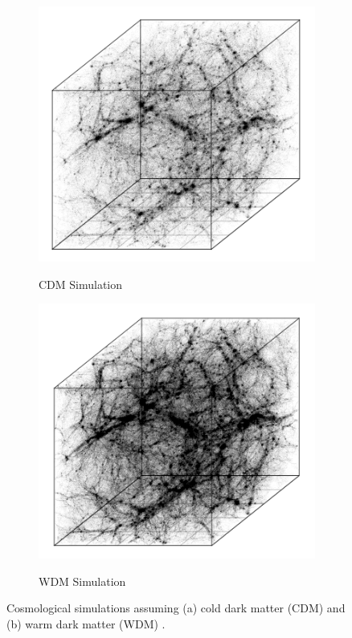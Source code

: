 \documentclass[12pt]{article}
\begin{document}
\begin{figure}[htp!]
  \centering
  \begin{subfigure}{.40\textwidth}
    \centering
    \caption{CDM Simulation}  \includegraphics[width=\linewidth]{figure_1_whole_wdm.png}
    \label{fig:introDataCDM}
  \end{subfigure}
    \begin{subfigure}{.40\textwidth}
    \centering
    \caption{WDM Simulation}  \includegraphics[width=\linewidth]{figure_1_whole_cdm.png}
    \label{fig:introDataWDM}
  \end{subfigure}
    \caption{Cosmological simulations assuming (a) cold dark matter (CDM) and (b) warm dark matter (WDM) \citep{schaye2015eagle}. }
    \label{fig:introData}
\end{figure}
\end{document}
